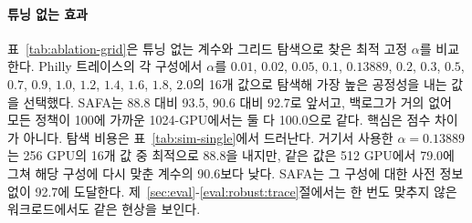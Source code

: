 \documentclass{ieeetj}
\begin{document}
\begin{table}[htb!]
\centering
\caption{구성별로 다시 맞춘 그리드 탐색 최적 고정 $\alpha$와 튜닝 없는 계수 비교}
\label{tab:ablation-grid}
\footnotesize
{}
\end{table}

\paragraph{튜닝 없는 효과}
표~\ref{tab:ablation-grid}은 튜닝 없는 계수와 그리드 탐색으로 찾은 최적 고정 $\alpha$를 비교한다. Philly 트레이스의 각 구성에서 $\alpha$를 $0.01$, $0.02$, $0.05$, $0.1$, $0.13889$, $0.2$, $0.3$, $0.5$, $0.7$, $0.9$, $1.0$, $1.2$, $1.4$, $1.6$, $1.8$, $2.0$의 16개 값으로 탐색해 가장 높은 공정성을 내는 값을 선택했다. SAFA는 88.8 대비 93.5, 90.6 대비 92.7로 앞서고, 백로그가 거의 없어 모든 정책이 100에 가까운 1024-GPU에서는 둘 다 100.0으로 같다. 핵심은 점수 차이가 아니다. 탐색 비용은 표~\ref{tab:sim-single}에서 드러난다. 거기서 사용한 $\alpha=0.13889$는 256 GPU의 16개 값 중 최적으로 88.8을 내지만, 같은 값은 512 GPU에서 79.0에 그쳐 해당 구성에 다시 맞춘 계수의 90.6보다 낮다. SAFA는 그 구성에 대한 사전 정보 없이 92.7에 도달한다. 제~\ref{sec:eval}-\ref{eval:robust:trace}절에서는 한 번도 맞추지 않은 워크로드에서도 같은 현상을 보인다.
\end{document}
